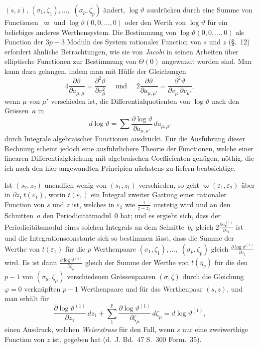 \documentclass[a4paper,12pt,leqno]{article}
\begin{document}
$(s,z)$, $(\sigma_1, \zeta_1),\ldots,$ $(\sigma_p, \zeta_p)$
\"{a}ndert, $\log \vartheta$ ausdr\"{u}cken durch eine Summe von
Functionen~$\varpi$ und
$\log \vartheta (0,0,\ldots,0)$
oder den Werth von $\log \vartheta$ f\"{u}r ein beliebiges
anderes Werthensystem.  Die Bestimmung von
$\log \vartheta (0,0,\ldots, 0)$
als Function der $3p - 3$ Moduln des System rationaler Function
von $s$ und $z$ (\S.~12) erfordert \"{a}hnliche Betrachtungen,
wie sie von \emph{Jacobi} in seinen Arbeiten \"{u}ber
elliptische Functionen zur Bestimmung von $\Theta(0)$ angewandt
worden sind.  Man kann dazu gelangen, indem man mit H\"{u}lfe
der Gleichungen
\[ 4 \frac{\partial \vartheta}{\partial a_{\mu, \mu}}
   = \frac{\partial^2 \vartheta}{\partial v_\mu^2}
     \quad \mbox{ und } \quad
   2 \frac{\partial \vartheta}{\partial a_{\mu, \mu'}}
   = \frac{\partial^2 \vartheta}{\partial v_\mu \, \partial v_{\mu'}},\]
wenn $\mu$ von $\mu'$ verschieden ist, die Differentialquotienten
von $\log \vartheta$ nach den Gr\"{o}ssen~$a$ in
\[ d \log \vartheta
   = \sum \frac{\partial \log \vartheta}{\partial a_{\mu, \mu'}}
      \, da_{\mu, \mu'} \]
durch Integrale algebraischer Functionen ausdr\"{u}ckt.  F\"{u}r
die Ausf\"{u}hrung dieser Rechnung scheint jedoch eine
ausf\"{u}hrlichere Theorie der Functionen, welche einer linearen
Differentialgleichung mit algebraischen Coefficienten
gen\"{u}gen, n\"{o}thig, die ich nach den hier angewandten
Principien n\"{a}chstens zu liefern beabsichtige.

Ist $(s_2, z_2)$ unendlich wenig von $(s_1, z_1)$ verschieden, so
geht
$\varpi (\varepsilon_1, \varepsilon_2)$
\"{u}ber in $\partial z_1 \, t(\varepsilon_1)$, worin
$t(\varepsilon_1)$ ein Integral zweiter Gattung einer rationaler
Function von $s$ und $z$ ist, welches in $\varepsilon_1$ wie
$\displaystyle \frac{1}{z - z_1}$
unstetig wird und an den Schnitten~$a$ den
Periodicit\"{a}tmodul~$0$ hat; und es ergiebt sich, dass der
Periodicit\"{a}tsmodul eines solchen Integrals an dem
Schnitte~$b_\nu$ gleich
$\displaystyle 2 \frac{\partial u_\nu^{(1)}}{\partial z_1}$
ist und die Integrationsconstante sich so bestimmen l\"{a}sst,
dass die Summe der Werthe von $t(\varepsilon_1)$ f\"{u}r die $p$
Werthenpaare
$(\sigma_1, \zeta_1),\ldots,$ $(\sigma_p, \zeta_p)$
gleich
$\displaystyle \frac{\partial \log \vartheta^{(1)}}{\partial z_1}$
wird.  Es ist dann
$\displaystyle \frac{\partial \log \vartheta^{(1)}}{\partial \zeta_\mu}$
gleich der Summe der Werthe von $t(\eta_\nu)$ f\"{u}r die den
$p - 1$ von $(\sigma_\mu, \zeta_\mu)$ verschiedenen
Gr\"{o}ssenpaaren $(\sigma, \zeta)$ durch die Gleichung
$\varphi = 0$ verkn\"{u}pften $p - 1$ Werthenpaare und f\"{u}r
das Werthenpaar $(s,z)$, und man erh\"{a}lt f\"{u}r
\[ \frac{\partial \log \vartheta^{(1)}}{\partial z_1} \, dz_1
   + \sum_1^p \frac{\partial \log \vartheta^{(1)}}{\partial \zeta_\mu}
         \, d \zeta_\mu
   = d \log \vartheta^{(1)},\]
einen Ausdruck, welchen \emph{Weierstrass} f\"{u}r den Fall,
wenn $s$ nur eine zweiwerthige Function von $z$ ist, gegeben hat
(d.~J.  Bd.~47  S.~300 Form.~35).
\end{document}
